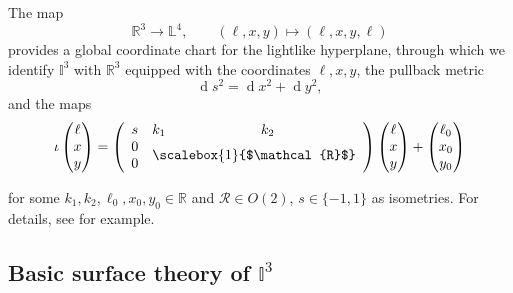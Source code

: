 \documentclass[12pt,a4paper,reqno]{amsart}
\theoremstyle{plain} %
\theoremstyle{definition}
\begin{document}
The map
$$
\mathbb{R}^3 \to \mathbb{L}^4, \qquad
(\ell,  x, y) \mapsto (\ell,  x, y,\ell)
$$
provides a global coordinate chart for the lightlike hyperplane,
through which we identify $\mathbb{I}^3$ with $\mathbb{R}^3$ equipped with the coordinates 
$\ell, x, y$, the pullback metric
	\begin{equation}\label{Eq:MetricOfI3}
		\operatorname{d}\!s^2=\operatorname{d}\!x^2+\operatorname{d}\!y^2,
	\end{equation}
and the maps 
	\begin{equation}\label{Eq:202505200927AM}
	\iota\begin{pmatrix} \ell \\ x \\ y \end{pmatrix} = \left( \begin{array}{ccc}
   s & k_1 & k_2 \\
   \multicolumn{1}{c}{%
     \begin{array}{@{} c @{}}
       0 \\
       0 
     \end{array}
   } &
   \multicolumn{2}{c}{%
     \begin{array}{@{} c @{}}
       \vcenter{\hbox{\scalebox{1}{$\mathcal{R}$}}}
     \end{array}
   }
	\end{array} \right) \begin{pmatrix} \ell \\ x \\ y \end{pmatrix} + \begin{pmatrix} \ell_0 \\ x_0 \\ y_0 \end{pmatrix}
	\end{equation}

for some $k_1,k_2,\ell_0,x_0,y_0\in\mathbb{R}$ and $\mathcal{R} \in O(2)$, $s\in\{-1,1\}$
as isometries. For details, see \cite{Sachs, SY, Silva1,Strubecker} for example.

\subsection{ Basic surface theory of $\mathbb{I}^3$}\label{Sec:2.2}
\end{document}
